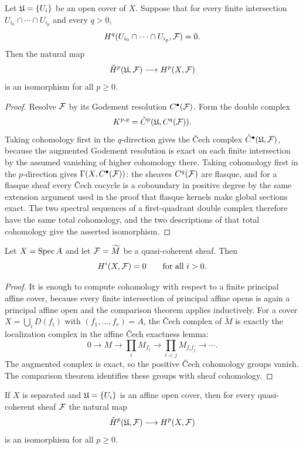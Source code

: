 \begin{theorem}
Let \(\mathfrak{U}=\{U_i\}\) be an open cover of \(X\).  Suppose that for every finite
intersection \(U_{i_0}\cap\cdots\cap U_{i_p}\) and every \(q>0\),
\[
    H^q(U_{i_0}\cap\cdots\cap U_{i_p},\mathcal{F})=0.
\]
Then the natural map
\[
    \check{H}^p(\mathfrak{U},\mathcal{F})\longrightarrow H^p(X,\mathcal{F})
\]
is an isomorphism for all \(p\ge0\).
\end{theorem}

\begin{proof}
Resolve \(\mathcal{F}\) by its Godement resolution \(C^\bullet(\mathcal{F})\).  Form the double
complex
\[
    K^{p,q}=\check{C}^p(\mathfrak{U},C^q(\mathcal{F})).
\]
Taking cohomology first in the \(q\)-direction gives the \v{C}ech complex
\(\check{C}^\bullet(\mathfrak{U},\mathcal{F})\), because the augmented Godement resolution is exact
on each finite intersection by the assumed vanishing of higher cohomology
there.  Taking cohomology first in the \(p\)-direction gives
\(\Gamma(X,C^\bullet(\mathcal{F}))\): the sheaves \(C^q(\mathcal{F})\) are flasque, and for a
flasque sheaf every \v{C}ech cocycle is a coboundary in positive degree by the
same extension argument used in the proof that flasque kernels make global
sections exact.  The two spectral sequences of a first-quadrant double complex
therefore have the same total cohomology, and the two descriptions of that
total cohomology give the asserted isomorphism.
\end{proof}

\begin{theorem}
Let \(X=\operatorname{Spec} A\) and let \(\mathcal{F}=\widetilde M\) be a quasi-coherent sheaf.  Then
\[
    H^i(X,\mathcal{F})=0\qquad\text{for all }i>0.
\]
\end{theorem}

\begin{proof}
It is enough to compute cohomology with respect to a finite principal affine
cover, because every finite intersection of principal affine opens is again a
principal affine open and the comparison theorem applies inductively.  For a
cover \(X=\bigcup_i D(f_i)\) with \((f_1,\ldots,f_r)=A\), the \v{C}ech complex
of \(\widetilde M\) is exactly the localization complex in the affine
\v{C}ech exactness lemma:
\[
0\to M\to \prod_i M_{f_i}\to \prod_{i<j}M_{f_if_j}\to\cdots .
\]
The augmented complex is exact, so the positive \v{C}ech cohomology groups
vanish.  The comparison theorem identifies these groups with sheaf cohomology.
\end{proof}

\begin{corollary}
If \(X\) is separated and \(\mathfrak{U}=\{U_i\}\) is an affine open cover, then for every
quasi-coherent sheaf \(\mathcal{F}\) the natural map
\[
    \check{H}^p(\mathfrak{U},\mathcal{F})\longrightarrow H^p(X,\mathcal{F})
\]
is an isomorphism for all \(p\ge0\).
\end{corollary}

